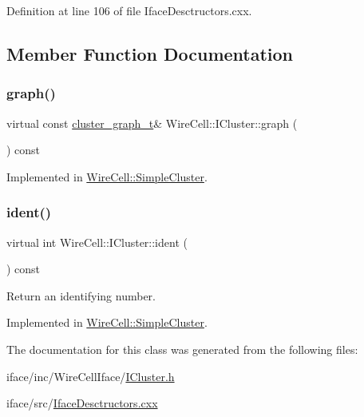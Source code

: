 Definition at line 106 of file Iface\+Desctructors.\+cxx.



\subsection{Member Function Documentation}
\mbox{\label{class_wire_cell_1_1_i_cluster_a974e30bf921937b6b98871525b51dedf}} 
\subsubsection{\texorpdfstring{graph()}{graph()}}
{\footnotesize\ttfamily virtual const \hyperlink{namespace_wire_cell_a6a9ecba14dfba50cdb081820a8bcacbe}{cluster\+\_\+graph\+\_\+t}\& Wire\+Cell\+::\+I\+Cluster\+::graph (\begin{DoxyParamCaption}{ }\end{DoxyParamCaption}) const\hspace{0.3cm}{\ttfamily [pure virtual]}}



Implemented in \hyperlink{class_wire_cell_1_1_simple_cluster_a0a501609a8aeb248675486855c3afb39}{Wire\+Cell\+::\+Simple\+Cluster}.

\mbox{\label{class_wire_cell_1_1_i_cluster_a64b77adf75c8a213a355bece6679f1d5}} 
\subsubsection{\texorpdfstring{ident()}{ident()}}
{\footnotesize\ttfamily virtual int Wire\+Cell\+::\+I\+Cluster\+::ident (\begin{DoxyParamCaption}{ }\end{DoxyParamCaption}) const\hspace{0.3cm}{\ttfamily [pure virtual]}}



Return an identifying number. 



Implemented in \hyperlink{class_wire_cell_1_1_simple_cluster_a2566bb51599fbf833d85bcc359d20c82}{Wire\+Cell\+::\+Simple\+Cluster}.



The documentation for this class was generated from the following files\+:\begin{DoxyCompactItemize}
\item 
iface/inc/\+Wire\+Cell\+Iface/\hyperlink{_i_cluster_8h}{I\+Cluster.\+h}\item 
iface/src/\hyperlink{_iface_desctructors_8cxx}{Iface\+Desctructors.\+cxx}\end{DoxyCompactItemize}
